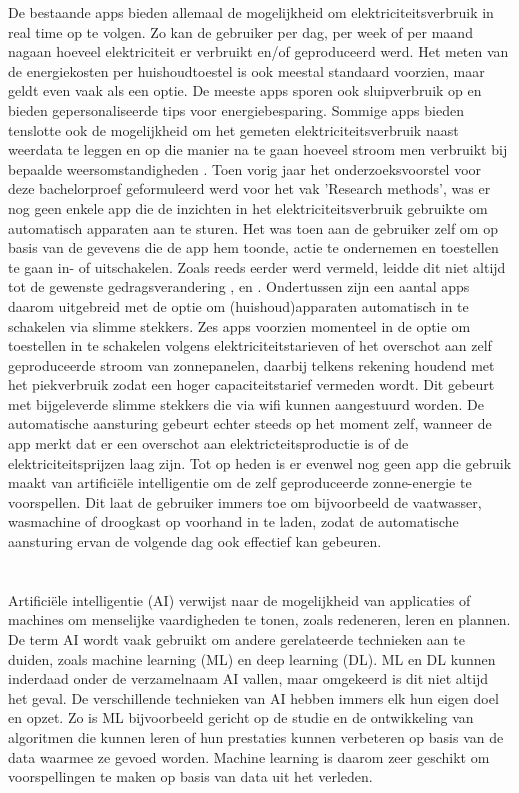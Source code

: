 De bestaande apps bieden allemaal de mogelijkheid om elektriciteitsverbruik in real time op te volgen. Zo kan de gebruiker per dag, per week of per maand nagaan hoeveel elektriciteit er verbruikt en/of geproduceerd werd. Het meten van de energiekosten per huishoudtoestel is ook meestal standaard voorzien, maar geldt even vaak als een optie. De meeste apps sporen ook sluipverbruik op en bieden gepersonaliseerde tips voor energiebesparing. Sommige apps bieden tenslotte ook de mogelijkheid om het gemeten elektriciteitsverbruik naast weerdata te leggen en op die manier na te gaan hoeveel stroom men verbruikt bij bepaalde weersomstandigheden \autocite{Deman2021}. Toen vorig jaar het onderzoeksvoorstel voor deze bachelorproef geformuleerd werd voor het vak 'Research methods', was er nog geen enkele app die de inzichten in het elektriciteitsverbruik gebruikte om automatisch apparaten aan te sturen. Het was toen aan de gebruiker zelf om op basis van de gevevens die de app hem toonde, actie te ondernemen en toestellen te gaan in- of uitschakelen. Zoals reeds eerder werd vermeld, leidde dit niet altijd tot de gewenste gedragsverandering \autocite{Wemyss2019}, \autocite{Mack2019} en  \autocite{VREG2021}. Ondertussen zijn een aantal apps daarom uitgebreid met de optie om (huishoud)apparaten automatisch in te schakelen via slimme stekkers. Zes apps voorzien momenteel in de optie om toestellen in te schakelen volgens elektriciteitstarieven of het overschot aan zelf geproduceerde stroom van zonnepanelen, daarbij telkens rekening houdend met het piekverbruik zodat een hoger capaciteitstarief vermeden wordt. Dit gebeurt met bijgeleverde slimme stekkers die via wifi kunnen aangestuurd worden. De automatische aansturing gebeurt echter steeds op het moment zelf, wanneer de app merkt dat er een overschot aan elektricteitsproductie is of de elektriciteitsprijzen laag zijn. Tot op heden is er evenwel nog geen app die gebruik maakt van artificiële intelligentie om de zelf geproduceerde zonne-energie te voorspellen. Dit laat de gebruiker immers toe om bijvoorbeeld de vaatwasser, wasmachine of droogkast op voorhand  in te laden, zodat de automatische aansturing ervan de volgende dag ook effectief kan gebeuren. 

\section{}%
\label{sec:voorspellingen maken met AI}

Artificiële intelligentie (AI) verwijst naar de mogelijkheid van applicaties of machines om menselijke vaardigheden te tonen, zoals redeneren, leren en plannen. De term AI wordt vaak gebruikt om andere gerelateerde technieken aan te duiden, zoals machine learning (ML) en deep learning (DL). ML en DL kunnen inderdaad onder de verzamelnaam AI vallen, maar omgekeerd is dit niet altijd het geval. De verschillende technieken van AI hebben immers elk hun eigen doel en opzet. Zo is ML bijvoorbeeld gericht op de studie en de ontwikkeling van algoritmen die kunnen leren of hun prestaties kunnen verbeteren op basis van de data waarmee ze gevoed worden. Machine learning is daarom zeer geschikt om voorspellingen te maken op basis van data uit het verleden. 

